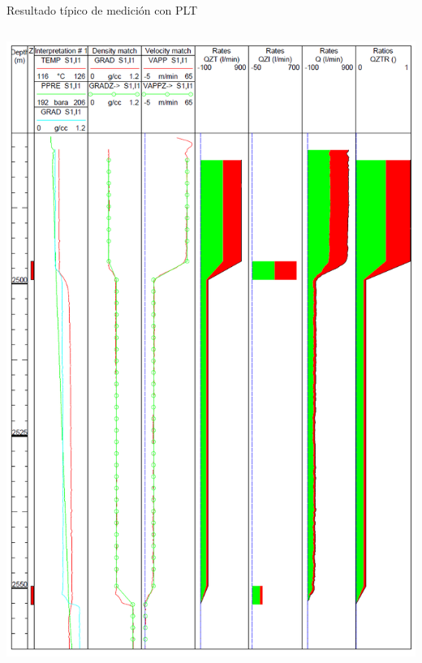 \documentclass[presentation]{beamer}
\begin{document}
\begin{frame}{Resultado típico de medición con PLT}
	\begin{columns}
		\includegraphics[scale=2, width=\textwidth]{./plt3.png}
		

\end{columns}
\end{frame}
\end{document}

